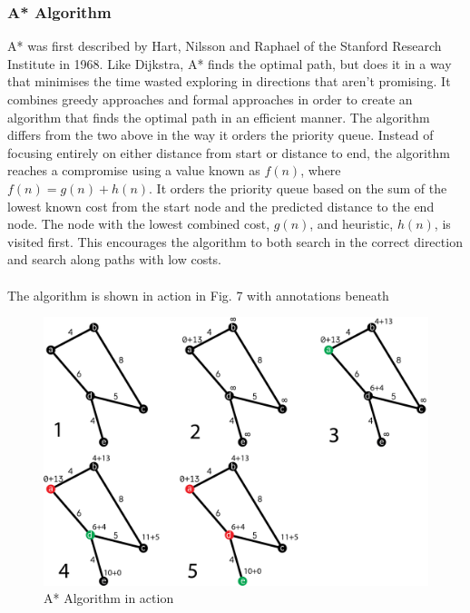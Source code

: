 \documentclass[titlepage]{article}
\begin{document}
\subsubsection{A* Algorithm}
A* was first described by Hart, Nilsson and Raphael of the Stanford Research Institute in 1968. Like Dijkstra, A* finds the optimal path, but does it in a way that minimises the time wasted exploring in directions that aren't promising. It combines greedy approaches and formal approaches in order to create an algorithm that finds the optimal path in an efficient manner. The algorithm differs from the two above in the way it orders the priority queue. Instead of focusing entirely on either distance from start or distance to end, the algorithm reaches a compromise using a value known as $f(n)$, where $f(n) = g(n) + h(n)$. It orders the priority queue based on the sum of the lowest known cost from the start node and the predicted distance to the end node. The node with the lowest combined cost, $g(n)$, and heuristic, $h(n)$, is visited first. This encourages the algorithm to both search in the correct direction and search along paths with low costs. \cite{astar}
\\\\
The algorithm is shown in action in Fig. 7 with annotations beneath
\begin{figure}[H]
  \centering
  \includegraphics[width=12cm]{Astar.png}
  \caption{A* Algorithm in action}
  \label{fig:astar}
\end{figure}
\end{document}
